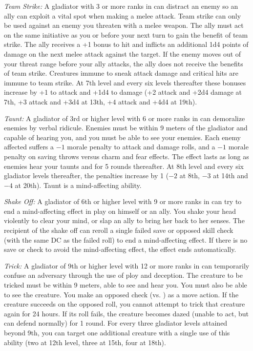 \textit{Team Strike:} A gladiator with 3 or more ranks in  can distract an enemy so an ally can exploit a vital spot when making a melee attack. Team strike can only be used against an enemy you threaten with a melee weapon. The ally must act on the same initiative as you or before your next turn to gain the benefit of team strike. The ally receives a +1 bonus to hit and inflicts an additional 1d4 points of damage on the next melee attack against the target. If the enemy moves out of your threat range before your ally attacks, the ally does not receive the benefits of team strike. Creatures immune to sneak attack damage and critical hits are immune to team strike. At 7th level and every six levels thereafter these bonuses increase by +1 to attack and +1d4 to damage (+2 attack and +2d4 damage at 7th, +3 attack and +3d4 at 13th, +4 attack and +4d4 at 19th).

\textit{Taunt:} A gladiator of 3rd or higher level with 6 or more ranks in  can demoralize enemies by verbal ridicule. Enemies must be within 9 meters of the gladiator and capable of hearing you, and you must be able to see your enemies. Each enemy affected suffers a $-1$ morale penalty to attack and damage rolls, and a $-1$ morale penalty on saving throws versus charm and fear effects. The effect lasts as long as enemies hear your taunts and for 5 rounds thereafter. At 8th level and every six gladiator levels thereafter, the penalties increase by 1 ($-2$ at 8th, $-3$ at 14th and $-4$ at 20th). Taunt is a mind-affecting ability.

\textit{Shake Off:} A gladiator of 6th or higher level with 9 or more ranks in  can try to end a mind-affecting effect in play on himself or an ally. You shake your head violently to clear your mind, or slap an ally to bring her back to her senses. The recipient of the shake off can reroll a single failed save or opposed skill check (with the same DC as the failed roll) to end a mind-affecting effect. If there is no save or check to avoid the mind-affecting effect, the effect ends automatically.

\textit{Trick:} A gladiator of 9th or higher level with 12 or more ranks in  can temporarily confuse an adversary through the use of ploy and deception. The creature to be tricked must be within 9 meters, able to see and hear you. You must also be able to see the creature. You make an opposed  check (vs. ) as a move action. If the creature succeeds on the opposed roll, you cannot attempt to trick that creature again for 24 hours. If its roll fails, the creature becomes dazed (unable to act, but can defend normally) for 1 round. For every three gladiator levels attained beyond 9th, you can target one additional creature with a single use of this ability (two at 12th level, three at 15th, four at 18th).

